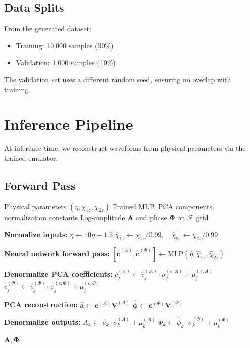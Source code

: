 \documentclass[11pt,a4paper]{article}
\newcommand{\Mf}{\mathcal{F}}
\begin{document}
\subsection{Data Splits}

From the generated dataset:
\begin{itemize}
    \item Training: 10,000 samples (90\%)
    \item Validation: 1,000 samples (10\%)
\end{itemize}

The validation set uses a different random seed, ensuring no overlap with training.

\section{Inference Pipeline}
\label{sec:inference}

At inference time, we reconstruct waveforms from physical parameters via the trained emulator.

\subsection{Forward Pass}

\begin{algorithm}[H]
\caption{Waveform Emulation (Inference)}
\label{alg:inference}
\begin{algorithmic}[1]
\Require Physical parameters $(\eta, \chi_{1z}, \chi_{2z})$
\Require Trained MLP, PCA components, normalization constants
\Ensure Log-amplitude $\mathbf{A}$ and phase $\mathbf{\Phi}$ on $\Mf$ grid

\State \textbf{Normalize inputs:}
\State $\hat{\eta} \gets 10\eta - 1.5$
\State $\hat{\chi}_{1z} \gets \chi_{1z} / 0.99, \quad \hat{\chi}_{2z} \gets \chi_{2z} / 0.99$

\State \textbf{Neural network forward pass:}
\State $[\hat{\mathbf{c}}^{(A)}, \hat{\mathbf{c}}^{(\Phi)}] \gets \text{MLP}(\hat{\eta}, \hat{\chi}_{1z}, \hat{\chi}_{2z})$ 

\State \textbf{Denormalize PCA coefficients:}
\State $c^{(A)}_j \gets \hat{c}^{(A)}_j \cdot \sigma^{(c,A)}_j + \mu^{(c,A)}_j$
\State $c^{(\Phi)}_j \gets \hat{c}^{(\Phi)}_j \cdot \sigma^{(c,\Phi)}_j + \mu^{(c,\Phi)}_j$

\State \textbf{PCA reconstruction:}
\State $\hat{\mathbf{a}} \gets \mathbf{c}^{(A)} \mathbf{V}^{(A)}$ 
\State $\hat{\bm{\phi}} \gets \mathbf{c}^{(\Phi)} \mathbf{V}^{(\Phi)}$

\State \textbf{Denormalize outputs:}
\State $A_k \gets \hat{a}_k \cdot \sigma^{(A)}_k + \mu^{(A)}_k$ 
\State $\Phi_k \gets \hat{\phi}_k \cdot \sigma^{(\Phi)}_k + \mu^{(\Phi)}_k$

\State \Return $\mathbf{A}, \mathbf{\Phi}$
\end{algorithmic}
\end{algorithm}
\end{document}
